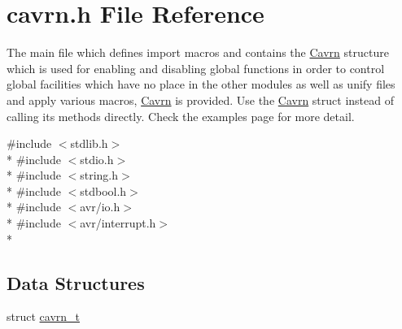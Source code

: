 \hypertarget{a00011}{\section{cavrn.\-h File Reference}
\label{a00011}
}


The main file which defines import macros and contains the \hyperlink{a00005}{Cavrn} structure which is used for enabling and disabling global functions in order to control global facilities which have no place in the other modules as well as unify files and apply various macros, \hyperlink{a00005}{Cavrn} is provided. Use the \hyperlink{a00005}{Cavrn} struct instead of calling its methods directly. Check the examples page for more detail.  


{\ttfamily \#include $<$stdlib.\-h$>$}\\*
{\ttfamily \#include $<$stdio.\-h$>$}\\*
{\ttfamily \#include $<$string.\-h$>$}\\*
{\ttfamily \#include $<$stdbool.\-h$>$}\\*
{\ttfamily \#include $<$avr/io.\-h$>$}\\*
{\ttfamily \#include $<$avr/interrupt.\-h$>$}\\*
\subsection*{Data Structures}
\begin{DoxyCompactItemize}
\item 
struct \hyperlink{a00006}{cavrn\-\_\-t}
\end{DoxyCompactItemize}
